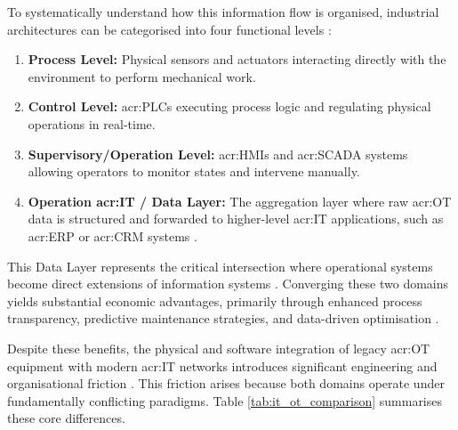 To systematically understand how this information flow is organised, industrial architectures can be categorised into four functional levels \cite{hwi_ot_definition}:
\begin{enumerate}
	\item \textbf{Process Level:} Physical sensors and actuators interacting directly with the environment to perform mechanical work.
	\item \textbf{Control Level:} \glspl{acr:PLC} executing process logic and regulating physical operations in real-time.
	\item \textbf{Supervisory/Operation Level:} \glspl{acr:HMI} and \gls{acr:SCADA} systems allowing operators to monitor states and intervene manually.
	\item \textbf{Operation \gls{acr:IT} / Data Layer:} The aggregation layer where raw \gls{acr:OT} data is structured and forwarded to higher-level \gls{acr:IT} applications, such as \gls{acr:ERP} or \gls{acr:CRM} systems \cite[p. 404]{10.1007/978-3-030-85969-5_37}.
\end{enumerate}

This Data Layer represents the critical intersection where operational systems become direct extensions of information systems \cite[p. 4]{EHIE2020103166}. Converging these two domains yields substantial economic advantages, primarily through enhanced process transparency, predictive maintenance strategies, and data-driven optimisation \cite{hwi_ot_definition}. 
 
Despite these benefits, the physical and software integration of legacy \gls{acr:OT} equipment with modern \gls{acr:IT} networks introduces significant engineering and organisational friction \cite{orise2025itotconvergence}. This friction arises because both domains operate under fundamentally conflicting paradigms. Table \ref{tab:it_ot_comparison} summarises these core differences. 
 
